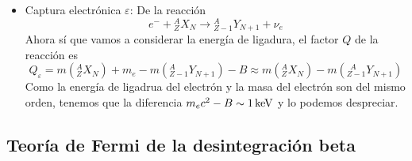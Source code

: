 \begin{itemize}
\begin{equation*}
\begin{aligned}
        \end{aligned}
    \end{equation*}
    Este proceso sólo se dará si el núcleo padre y el núcleo hijo se diferencian en $2m_e\sim \unit[1]{MeV}$.
    \item Captura electrónica $\varepsilon$: De la reacción
    \begin{equation*}
        e^-+{} ^A _Z X_N\longrightarrow{} ^{A} _{Z-1}Y_{N+1} + \nu_e
    \end{equation*}
    Ahora sí que vamos a considerar la energía de ligadura, el factor $Q$ de la reacción es 
    \begin{equation*}
        Q_\varepsilon=m(^A _Z X_N)+m_e-m({} ^{A} _{Z-1}Y_{N+1})-B\approx m(^A _Z X_N)-m({} ^{\ \ A} _{Z-1}Y_{N+1})
    \end{equation*}
    Como la energía de ligadrua del electrón y la masa del electrón son del mismo orden, tenemos que la diferencia $m_ec^2-B\sim \unit[1]{keV}$ y lo podemos despreciar.
\end{itemize}
\newpage
\subsection{Teoría de Fermi de la desintegración beta}

